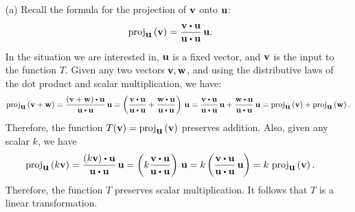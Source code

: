 \begin{solution}
  \begin{enumerate}
  \item[(a)] Recall the formula for the projection of $\mbox{\bf v}$ onto
    $\mbox{\bf u}$:
    \begin{equation*}
      \proj_{\vect{u}}\tup{\vect{v}}
      = \frac{\vect{v}\dotprod \vect{u}}{\vect{u}\dotprod \vect{u}}\,\vect{u}.
    \end{equation*}
    In the situation we are interested in, $\mbox{\bf u}$ is a fixed vector,
    and $\mbox{\bf v}$ is the input to the function $T$. Given any two
    vectors $\mbox{\bf v},\mbox{\bf w}$, and using the distributive laws of the dot
    product and scalar multiplication, we have:
    \begin{equation*}
      \proj_{\vect{u}}\tup{\vect{v}+\vect{w}}
      = \frac{(\vect{v}+\vect{w})\dotprod \vect{u}}{\vect{u}\dotprod \vect{u}}\,\vect{u}
      = \tup{\frac{\vect{v}\dotprod \vect{u}}{\vect{u}\dotprod \vect{u}}
        + \frac{\vect{w}\dotprod \vect{u}}{\vect{u}\dotprod \vect{u}}}\,\vect{u}
      = \frac{\vect{v}\dotprod \vect{u}}{\vect{u}\dotprod \vect{u}}\,\vect{u}
      + \frac{\vect{w}\dotprod \vect{u}}{\vect{u}\dotprod \vect{u}}\,\vect{u}
      = \proj_{\vect{u}}\tup{\vect{v}}
      + \proj_{\vect{u}}\tup{\vect{w}}.
    \end{equation*}
    Therefore, the function
    $T(\vect{v}) = \proj_{\vect{u}}\tup{\vect{v}}$ preserves
    addition. Also, given any scalar $k$, we have
    \begin{equation*}
      \proj_{\vect{u}}\tup{k\vect{v}}
      = \frac{(k\vect{v})\dotprod \vect{u}}{\vect{u}\dotprod \vect{u}}\,\vect{u}
      = \tup{k\frac{\vect{v}\dotprod \vect{u}}{\vect{u}\dotprod \vect{u}}}\,\vect{u}
      = k\tup{\frac{\vect{v}\dotprod \vect{u}}{\vect{u}\dotprod \vect{u}}\,\vect{u}}
      = k\,\proj_{\vect{u}}\tup{\vect{v}}.
    \end{equation*}
    Therefore, the function $T$ preserves scalar multiplication. It
    follows that $T$ is a linear transformation.


\end{enumerate}
\end{solution}

